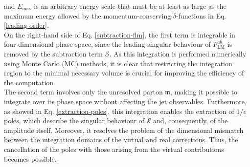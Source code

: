 \documentclass[a4paper, 12pt]{book}
\newcommand{\um}{\mathfrak{m}}
\begin{document}
and $E_{\mathrm{max}}$ is an arbitrary energy scale that must be at least as large as the maximum energy allowed by the momentum-conserving $\delta$-functions in Eq. \ref{leading-order}.\\
On the right-hand side of Eq. \ref{subtraction-flm}, the first term is integrable in four-dimensional phase space, since the leading singular behaviour of $F^{ab}_{\mathrm{LM}}$ is removed by the subtraction term $\mathcal{S}$. As this integration is performed numerically using Monte Carlo (MC) methods, it is clear that restricting the integration region to the minimal necessary volume is crucial for improving the efficiency of the computation. \\
The second term involves only the unresolved parton $\um$, making it possible to integrate over its phase space without affecting the jet observables. Furthermore, as showed in Eq. \ref{extraction-poles}, this integration enables the extraction of $1/\epsilon$ poles, which describe the singular behaviour of $\mathcal{S}$ and, consequently, of the amplitude itself. Moreover, it resolves the problem of the dimensional mismatch between the integration domains of the virtual and real corrections. Thus, the cancellation of the poles with those arising from the virtual contributions becomes possible.
\end{document}
